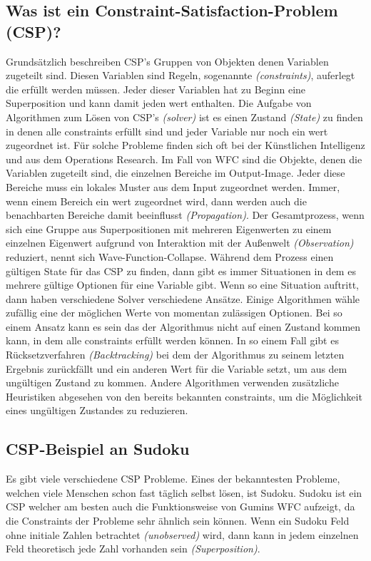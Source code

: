 \documentclass[12pt, a4paper,twoside,openright]{report} %
\begin{document}
\subsection{Was ist ein Constraint-Satisfaction-Problem {(CSP)}?}
Grundsätzlich beschreiben CSP's Gruppen von Objekten denen Variablen zugeteilt sind.
Diesen Variablen sind Regeln, sogenannte \textit{(constraints)}, auferlegt die erfüllt werden müssen.
Jeder dieser Variablen hat zu Beginn eine Superposition und kann damit jeden wert enthalten.
Die Aufgabe von Algorithmen zum Lösen von CSP's \textit{(solver)} ist es einen Zustand \textit{(State)} zu finden in denen alle constraints erfüllt sind und jeder Variable nur noch ein wert zugeordnet ist.
Für solche Probleme finden sich oft bei der Künstlichen Intelligenz und aus dem Operations Research. \cite{Lecoutre2009ConstraintNT}
Im Fall von WFC sind die Objekte, denen die Variablen zugeteilt sind, die einzelnen Bereiche im Output-Image.
Jeder diese Bereiche muss ein lokales Muster aus dem Input zugeordnet werden.
Immer, wenn einem Bereich ein wert zugeordnet wird, dann werden auch die benachbarten Bereiche damit beeinflusst \textit{(Propagation)}.
Der Gesamtprozess, wenn sich eine Gruppe aus Superpositionen mit mehreren Eigenwerten zu einem einzelnen Eigenwert aufgrund von Interaktion mit der Außenwelt \textit{(Observation)} reduziert,
nennt sich Wave-Function-Collapse. \cite{Zinkernagel_2016}
Während dem Prozess einen gültigen State für das CSP zu finden, dann gibt es immer Situationen in dem es mehrere gültige Optionen für eine Variable gibt.
Wenn so eine Situation auftritt, dann haben verschiedene Solver verschiedene Ansätze.
Einige Algorithmen wähle zufällig eine der möglichen Werte von momentan zulässigen Optionen.
Bei so einem Ansatz kann es sein das der Algorithmus nicht auf einen Zustand kommen kann, in dem alle constraints erfüllt werden können.
In so einem Fall gibt es Rücksetzverfahren \textit{(Backtracking)} bei dem der Algorithmus zu seinem letzten Ergebnis zurückfällt und ein anderen Wert für die Variable setzt, um aus dem
ungültigen Zustand zu kommen.
Andere Algorithmen verwenden zusätzliche Heuristiken abgesehen von den bereits bekannten constraints, um die Möglichkeit eines ungültigen Zustandes zu reduzieren. \cite{Karth2017WaveFunctionCollapseIC}

\subsection{CSP-Beispiel an Sudoku}
Es gibt viele verschiedene CSP Probleme.
Eines der bekanntesten Probleme, welchen viele Menschen schon fast täglich selbst lösen, ist Sudoku.
Sudoku ist ein CSP welcher am besten auch die Funktionsweise von Gumins WFC aufzeigt, da die Constraints der Probleme sehr ähnlich sein können.
Wenn ein Sudoku Feld ohne initiale Zahlen betrachtet \textit{(unobserved)} wird, dann kann in jedem einzelnen Feld theoretisch jede Zahl vorhanden sein \textit{(Superposition)}.
\end{document}
